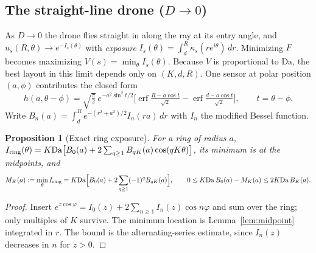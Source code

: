 \documentclass[11pt]{article}
\newtheorem{proposition}[theorem]{Proposition}
\theoremstyle{remark}
\newcommand{\Da}{\mathrm{Da}}
\begin{document}
\subsection{The straight-line drone ($D\to0$)}
As $D\to0$ the drone flies straight in along the ray at its entry angle, and
$u_s(R,\theta)\to e^{-I_s(\theta)}$ with \emph{exposure}
$I_s(\theta)=\int_d^R\kappa_s(re^{i\theta})\,dr$. Minimizing $F$ becomes maximizing
$V(s)=\min_\theta I_s(\theta)$. Because $V$ is proportional to $\Da$, the best layout in this
limit depends only on $(K,d,R)$. One sensor at polar position $(a,\phi)$ contributes the
closed form
\begin{equation}\label{eq:h}
h(a,\theta-\phi)=\sqrt{\tfrac{\pi}{2}}\,e^{-a^2\sin^2 t/2}
\Big[\operatorname{erf}\tfrac{R-a\cos t}{\sqrt2}-\operatorname{erf}\tfrac{d-a\cos t}{\sqrt2}\Big],
\qquad t=\theta-\phi .
\end{equation}
Write $B_n(a)=\int_d^R e^{-(r^2+a^2)/2}I_n(ra)\,dr$ with $I_n$ the modified Bessel function.

\begin{proposition}[Exact ring exposure]\label{prop:ringexposure}
For a ring of radius $a$,
$I_{\rm ring}(\theta)=K\Da\big[B_0(a)+2\sum_{q\ge1}B_{qK}(a)\cos(qK\theta)\big]$, its minimum is
at the midpoints, and
\[
M_K(a):=\min_\theta I_{\rm ring}=K\Da\Big[B_0(a)+2\sum_{q\ge1}(-1)^qB_{qK}(a)\Big],\qquad
0\le K\Da\,B_0(a)-M_K(a)\le 2K\Da\,B_K(a).
\]
\end{proposition}
\begin{proof}
Insert $e^{z\cos\varphi}=I_0(z)+2\sum_{n\ge1}I_n(z)\cos n\varphi$ and sum over the ring; only
multiples of $K$ survive. The minimum location is Lemma~\ref{lem:midpoint} integrated in $r$.
The bound is the alternating-series estimate, since $I_n(z)$ decreases in $n$ for $z>0$.
\end{proof}
\end{document}

